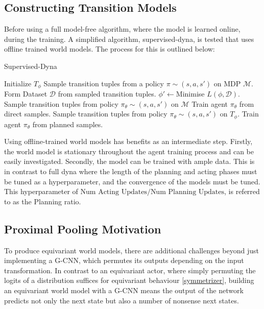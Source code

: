 \subsection{Constructing Transition Models}
Before using a full model-free algorithm, where the model is learned online, during the training. A simplified algorithm, supervised-dyna, is tested that uses offline trained world models. The process for this is outlined below:
\begin{algorithm}
	\caption{Supervised-Dyna}\label{alg:Supervised-Dyna}
	\begin{algorithmic}
		\State Initialize $T_\phi$
		\State Sample transition tuples from a policy $\pi \sim (s, a, s')$ on MDP $\mathcal{M}$.
		\State Form Dataset $\mathcal{D}$ from sampled transition tuples.
		\State $\phi' \leftarrow $Minimise $L(\phi , \mathcal{D})$.
		\EndFor
		\State Sample transition tuples from policy $\pi_\theta \sim (s, a, s')$ on $\mathcal{M}$
		\State Train agent $\pi_\theta$ from direct samples.
		\EndFor
		\State Sample transition tuples from policy $\pi_\theta \sim (s, a, s')$ on $T_\phi$.
		\State Train agent $\pi_\theta$ from planned samples.
		\EndFor
		\EndFor
	\end{algorithmic}
\end{algorithm}

Using offline-trained world models has benefits as an intermediate step. Firstly, the world model is stationary throughout the agent training process and can be easily investigated. Secondly, the model can be trained with ample data. This is in contrast to full dyna where the length of the planning and acting phases must be tuned as a hyperparameter, and the convergence of the models must be tuned. This hyperparameter of $\text{Num Acting Updates}/\text{Num Planning Updates}$, is referred to as the Planning ratio.


\subsection{Proximal Pooling Motivation}
To produce equivariant world models, there are additional challenges beyond just implementing a G-CNN, which permutes its outputs depending on the input transformation. In contrast to an equivariant actor, where simply permuting the logits of a distribution suffices for equivariant behaviour \ref{symmetrizer}, building an equivariant world model with a G-CNN means the output of the network predicts not only the next state but also a number of nonsense next states.

